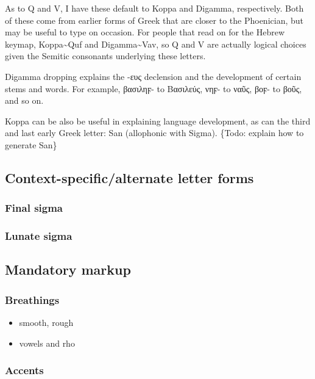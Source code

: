 \documentclass[11pt]{article}
\begin{document}
\begin{enumerate}
As to Q and V, I have these default to Koppa and Digamma, respectively. Both of these come from earlier forms of Greek that are closer to the Phoenician, but may be useful to type on occasion. For people that read on for the Hebrew keymap, Koppa\textasciitilde{}Quf and Digamma\textasciitilde{}Vav, so Q and V are actually logical choices given the Semitic consonants underlying these letters.

Digamma dropping explains the -ευς declension and the development of certain stems and words. For example, βασιληϝ- to Βασιλεύς, νηϝ- to ναῦς, βοϝ- to βοῦς, and so on.

Koppa can be also be useful in explaining language development, as can the third and last early Greek letter: San (allophonic with Sigma). \{Todo: explain how to generate San\}
\end{enumerate}

\subsection{Context-specific/alternate letter forms}
\label{sec:org80729e1}

\subsubsection{Final sigma}
\label{sec:org5497e7d}

\subsubsection{Lunate sigma}
\label{sec:orge074857}

\subsection{Mandatory markup}
\label{sec:orge267d44}

\subsubsection{Breathings}
\label{sec:orgf73c507}

\begin{itemize}
\item smooth, rough
\item vowels and rho
\end{itemize}

\subsubsection{Accents}
\label{sec:org630c3f9}
\end{document}
